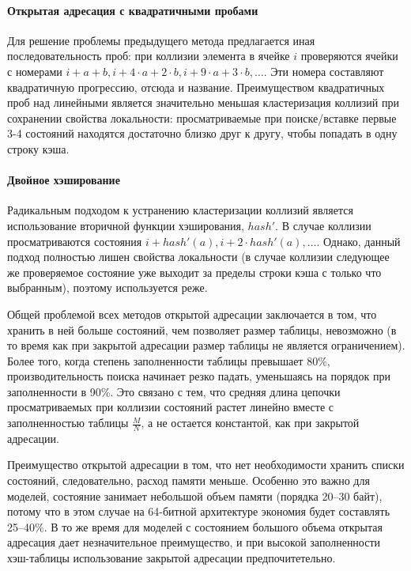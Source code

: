 \paragraph{Открытая адресация с квадратичными пробами}
\label{sec:open-quadratic-probing}

Для решение проблемы предыдущего метода предлагается иная последовательность проб: при
коллизии элемента в ячейке $i$ проверяются ячейки с номерами $i + a + b, i + 4 \cdot a + 2
\cdot b, i + 9 \cdot a + 3\cdot b, \ldots$. Эти номера составляют квадратичную прогрессию,
отсюда и название. Преимуществом квадратичных проб над линейными является значительно
меньшая кластеризация коллизий при сохранении свойства локальности: просматриваемые при
поиске/вставке первые 3-4 состояний находятся достаточно близко друг к другу, чтобы
попадать в одну строку кэша.

\paragraph{Двойное хэширование}
\label{sec:open-double-hashing}

Радикальным подходом к устранению кластеризации коллизий является использование вторичной
функции хэширования, $hash'$. В случае коллизии просматриваются состояния $i + hash'(a), i
+ 2\cdot hash'(a), \ldots$. Однако, данный подход полностью лишен свойства локальности (в
случае коллизии следующее же проверяемое состояние уже выходит за пределы строки кэша
с только что выбранным), поэтому используется реже.

Общей проблемой всех методов открытой адресации заключается в том, что хранить в ней
больше состояний, чем позволяет размер таблицы, невозможно (в то время как при закрытой
адресации размер таблицы не является ограничением). Более того, когда степень
заполненности таблицы превышает 80\%, производительность поиска начинает резко падать,
уменьшаясь на порядок при заполненности в 90\%. Это связано с тем, что средняя длина
цепочки просматриваемых при коллизии состояний растет линейно вместе с заполненностью
таблицы $\frac{M}{N}$, а не остается константой, как при закрытой адресации.

Преимущество открытой адресации в том, что нет необходимости хранить списки состояний,
следовательно, расход памяти меньше. Особенно это важно для моделей, состояние занимает
небольшой объем памяти (порядка 20--30 байт), потому что в этом случае на 64-битной
архитектуре экономия будет составлять 25--40\%. В то же время для моделей с состоянием
большого объема открытая адресация дает незначительное преимущество, и при высокой
заполненности хэш-таблицы использование закрытой адресации предпочитетельно.

